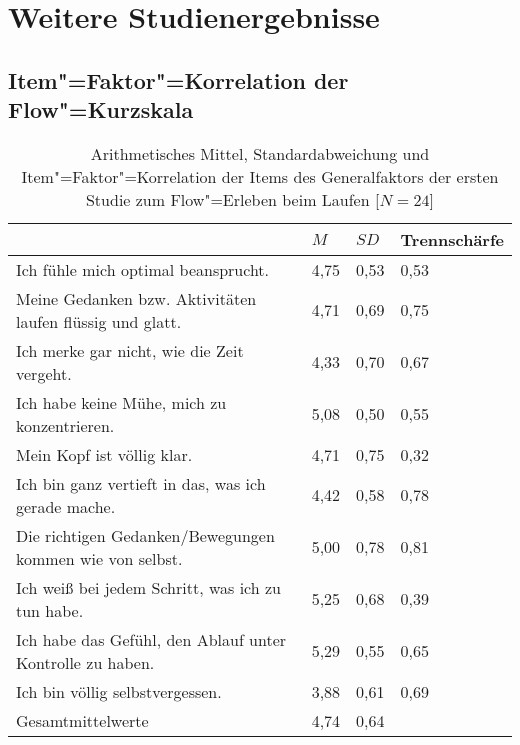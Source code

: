 

\chapter{Weitere Studienergebnisse} 

\label{cha:weitere_studienergebnisse}

\section{Item"=Faktor"=Korrelation der Flow"=Kurzskala} 

\label{sec:item_faktor_korrelation_der_fks} 
\begin{table}
	[!htb] \centering \caption[Item"=Faktor"=Korrelation der Items des Generalfaktors (Erste Studie: Laufen)]{Arithmetisches Mittel, Standardabweichung und Item"=Faktor"=Korrelation der Items des Generalfaktors der ersten Studie zum Flow"=Erleben beim Laufen [$N = 24$]} \label{tab:generalfaktor_1} 
	\begin{tabularx}
		{ 
		\textwidth}{p{} p{} p{} p{}} \toprule & $M$ & $SD$ & Trennschärfe \\
		\midrule Ich fühle mich optimal beansprucht. & 4,75 & 0,53 & 0,53 \\
		Meine Gedanken bzw. Aktivitäten laufen flüssig und glatt. & 4,71 & 0,69 & 0,75 \\
		Ich merke gar nicht, wie die Zeit vergeht. & 4,33 & 0,70 & 0,67 \\
		Ich habe keine Mühe, mich zu konzentrieren. & 5,08 & 0,50 & 0,55 \\
		Mein Kopf ist völlig klar. & 4,71 & 0,75 & 0,32 \\
		Ich bin ganz vertieft in das, was ich gerade mache. & 4,42 & 0,58 & 0,78 \\
		Die richtigen Gedanken/Bewegungen kommen wie von selbst. & 5,00 & 0,78 & 0,81 \\
		Ich weiß bei jedem Schritt, was ich zu tun habe. & 5,25 & 0,68 & 0,39 \\
		Ich habe das Gefühl, den Ablauf unter Kontrolle zu haben. & 5,29 & 0,55 & 0,65 \\
		Ich bin völlig selbstvergessen. & 3,88 & 0,61 & 0,69 \\
		Gesamtmittelwerte & 4,74 & 0,64 & \\
		\bottomrule 
	\end{tabularx}
\end{table}
